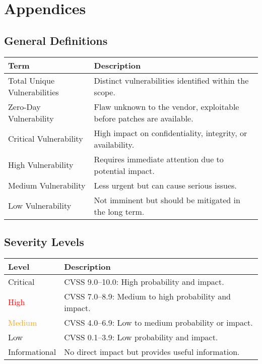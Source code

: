\documentclass[a4paper,12pt]{article}
\begin{document}
\section{Appendices}

\subsection{General Definitions}

\begin{table}[H]
    \centering
    \begin{tabular}{lp{8cm}}
        \toprule
        \rowcolor{gray!20} \textbf{Term} & \textbf{Description} \\
        \midrule
        Total Unique Vulnerabilities & Distinct vulnerabilities identified within the scope. \\ 
        Zero-Day Vulnerability & Flaw unknown to the vendor, exploitable before patches are available. \\
        Critical Vulnerability & High impact on confidentiality, integrity, or availability. \\
        High Vulnerability & Requires immediate attention due to potential impact. \\
        Medium Vulnerability & Less urgent but can cause serious issues. \\
        Low Vulnerability & Not imminent but should be mitigated in the long term. \\
        \bottomrule
    \end{tabular}
\end{table}

\subsection{Severity Levels}

\begin{table}[H]
    \centering
    \begin{tabular}{lp{10cm}}
        \toprule
        \rowcolor{gray!20} \textbf{Level} & \textbf{Description} \\
        \midrule
        \textcolor{BrickRed}{Critical} & CVSS 9.0–10.0: High probability and impact. \\
        \textcolor{Red}{High} & CVSS 7.0–8.9: Medium to high probability and impact. \\
        \textcolor{Orange}{Medium} & CVSS 4.0–6.9: Low to medium probability or impact. \\
        \textcolor{NavyBlue}{Low} & CVSS 0.1–3.9: Low probability and impact. \\
        \textcolor{Periwinkle}{Informational} & No direct impact but provides useful information. \\
        \bottomrule
    \end{tabular}
\end{table}
\end{document}
